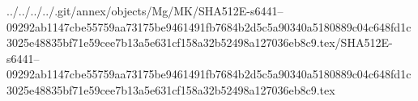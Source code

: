 ../../../../.git/annex/objects/Mg/MK/SHA512E-s6441--09292ab1147cbe55759aa73175be9461491fb7684b2d5c5a90340a5180889c04c648fd1c3025e48835bf71e59cee7b13a5e631cf158a32b52498a127036eb8c9.tex/SHA512E-s6441--09292ab1147cbe55759aa73175be9461491fb7684b2d5c5a90340a5180889c04c648fd1c3025e48835bf71e59cee7b13a5e631cf158a32b52498a127036eb8c9.tex